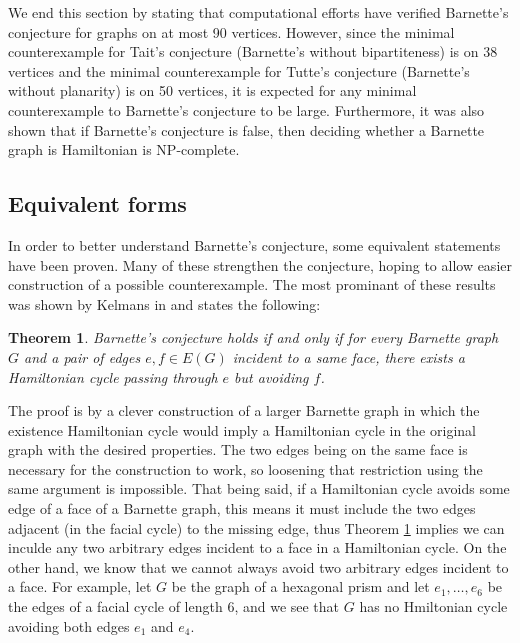 \documentclass{scrartcl}
\theoremstyle{definition}
\theoremstyle{plain}
\newtheorem{theorem}{Theorem}
\begin{document}
We end this section by stating that computational efforts \cite{Brinkmann2021-eb} have verified
Barnette's conjecture for graphs on at most 90 vertices.
However, since the minimal counterexample for Tait's conjecture \cite{Holton1988-qm} (Barnette's
without bipartiteness) is on 38 vertices and the minimal counterexample for Tutte's conjecture
\cite{Brinkmann2021-eb} (Barnette's without planarity) is on 50 vertices, it is expected for any
minimal counterexample to Barnette's conjecture to be large.
Furthermore, it was also shown \cite{Bagheri_Gh2022-xk} that if Barnette's conjecture is false,
then deciding whether a Barnette graph is Hamiltonian is NP-complete.

\subsection*{Equivalent forms}

In order to better understand Barnette's conjecture, some equivalent statements have been proven.
Many of these strengthen the conjecture, hoping to allow easier construction of a possible
counterexample.
The most prominant of these results was shown by Kelmans in \cite{Kelmans1994-qp}\footnotemark{}
and states the following:


\begin{theorem}
    \label{thm:kelmans1994}
    Barnette's conjecture holds if and only if for every Barnette graph $G$ and a pair of edges
    $e,f\in E(G)$ incident to a same face, there exists a Hamiltonian cycle passing through $e$ but
    avoiding $f$.
\end{theorem}

The proof is by a clever construction of a larger Barnette graph in which the existence Hamiltonian
cycle would imply a Hamiltonian cycle in the original graph with the desired properties.
The two edges being on the same face is necessary for the construction to work, so loosening that
restriction using the same argument is impossible.
That being said, if a Hamiltonian cycle avoids some edge of a face of a Barnette graph, this means
it must include the two edges adjacent (in the facial cycle) to the missing edge, thus Theorem
\ref{thm:kelmans1994} implies we can inculde any two arbitrary edges incident to a face in a
Hamiltonian cycle.
On the other hand, we know that we cannot always avoid two arbitrary edges incident to a face.
For example, let $G$ be the graph of a hexagonal prism and let $e_1,\dots,e_6$ be the edges of
a facial cycle of length 6, and we see that $G$ has no Hmiltonian cycle avoiding both edges $e_1$
and $e_4$.
\end{document}

